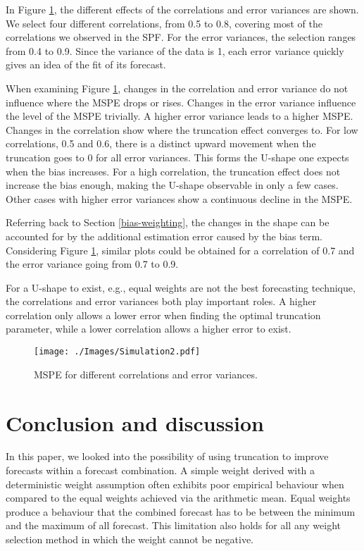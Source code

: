 \documentclass[11pt]{article}
\begin{document}
	In Figure \ref{fig: simulation}, the different effects of the correlations and error variances are shown. We select four different correlations, from 0.5 to 0.8, covering most of the correlations we observed in the SPF. For the error variances, the selection ranges from 0.4 to 0.9. Since the variance of the data is 1, each error variance quickly gives an idea of the fit of its forecast. 
	
	When examining Figure \ref{fig: simulation}, changes in the correlation and error variance do not influence where the MSPE drops or rises. Changes in the error variance influence the level of the MSPE trivially. A higher error variance leads to a higher MSPE. Changes in the correlation show where the truncation effect converges to. For low correlations, 0.5 and 0.6, there is a distinct upward movement when the truncation goes to 0 for all error variances. This forms the U-shape one expects when the bias increases. For a high correlation, the truncation effect does not increase the bias enough, making the U-shape observable in only a few cases. Other cases with higher error variances show a continuous decline in the MSPE. 
	
	Referring back to Section \ref{bias-weighting}, the changes in the shape can be accounted for by the additional estimation error caused by the bias term. Considering Figure \ref{fig: simulation}, similar plots could be obtained for a correlation of 0.7 and the error variance going from 0.7 to 0.9.
	
	For a U-shape to exist, e.g., equal weights are not the best forecasting technique, the correlations and error variances both play important roles. A higher correlation only allows a lower error when finding the optimal truncation parameter, while a lower correlation allows a higher error to exist.
	
	\begin{figure}[!h]
		\centering
		\texttt{[image: ./Images/Simulation2.pdf]}
		\caption{MSPE for different correlations and error variances.}\label{fig: simulation}
	\end{figure}
	
	\section{Conclusion and discussion}\label{conclusion}
	In this paper, we looked into the possibility of using truncation to improve forecasts within a forecast combination. A simple weight derived with a deterministic weight assumption often exhibits poor empirical behaviour when compared to the equal weights achieved via the arithmetic mean. Equal weights produce a behaviour that the combined forecast has to be between the minimum and the maximum of all forecast. This limitation also holds for all any weight selection method in which the weight cannot be negative. 
	
\end{document}
